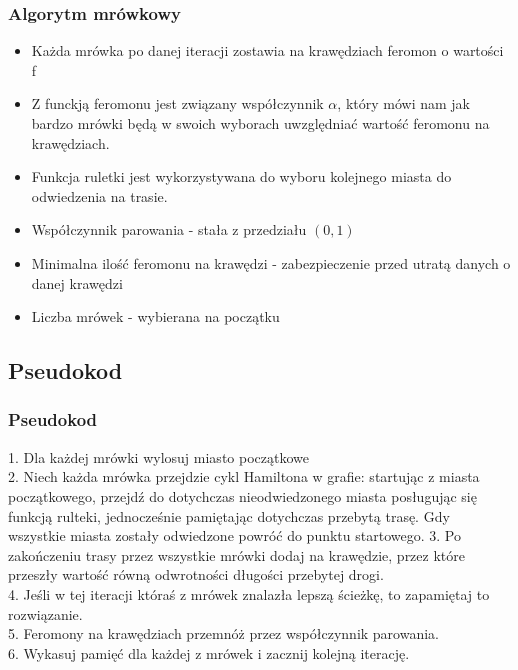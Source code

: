 \documentclass{beamer}
\begin{document}
\begin{frame}
\frametitle{Algorytm mrówkowy}
\begin{itemize}

\item Każda mrówka po danej iteracji zostawia na krawędziach feromon o wartości f \\
\item Z funckją feromonu jest związany współczynnik $\alpha$, który mówi nam jak bardzo mrówki będą w swoich wyborach uwzględniać wartość feromonu na krawędziach. \\
\item Funkcja ruletki jest wykorzystywana do wyboru kolejnego miasta do odwiedzenia na trasie.\\
\item Współczynnik parowania - stała z przedziału $(0,1)$ \\
\item Minimalna ilość feromonu na krawędzi - zabezpieczenie przed utratą danych o danej krawędzi \\
\item Liczba mrówek - wybierana na początku \\
\end{itemize}
\end{frame}

\subsection{Pseudokod}

\begin{frame}
\frametitle{Pseudokod}
1. Dla każdej mrówki wylosuj miasto początkowe \\
2. Niech każda mrówka przejdzie cykl Hamiltona w grafie: startując z miasta początkowego, przejdź do dotychczas nieodwiedzonego miasta posługując się funkcją rulteki, jednocześnie pamiętając dotychczas przebytą trasę. Gdy wszystkie miasta zostały odwiedzone powróć do punktu startowego.
3. Po zakończeniu trasy przez wszystkie mrówki dodaj na krawędzie, przez które przeszły wartość równą odwrotności długości przebytej drogi. \\
4. Jeśli w tej iteracji któraś z mrówek znalazła lepszą ścieżkę, to zapamiętaj to rozwiązanie.\\
5. Feromony na krawędziach przemnóż przez współczynnik parowania.\\
6. Wykasuj pamięć dla każdej z mrówek i zacznij kolejną iterację.\\


\end{frame}
\end{document}
